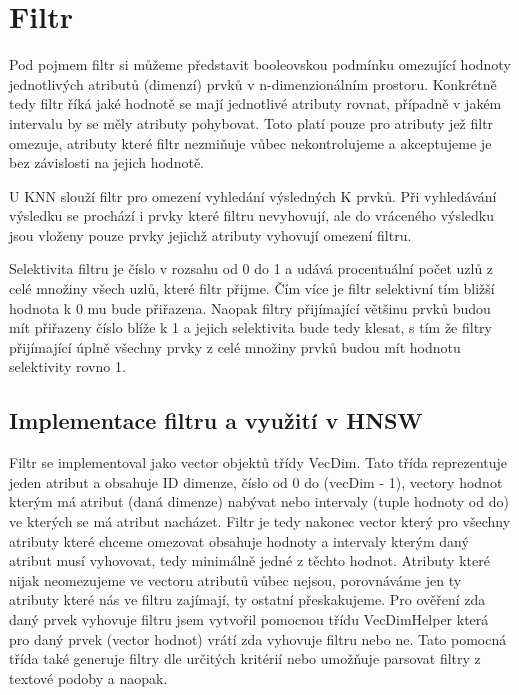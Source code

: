 \documentclass[czech,semestral,dept460,male,csharp,cpdeclaration]{diploma}
\begin{document}
	\chapter{Filtr}
	\label{chap_filtr}
	
		Pod pojmem filtr si můžeme představit booleovskou podmínku omezující hodnoty jednotlivých atributů (dimenzí) prvků v n-dimenzionálním prostoru. Konkrétně tedy filtr říká jaké hodnotě se mají jednotlivé atributy rovnat, případně v jakém intervalu by se měly atributy pohybovat. Toto platí pouze pro atributy jež filtr omezuje, atributy které filtr nezmiňuje vůbec nekontrolujeme a akceptujeme je bez závislosti na jejich hodnotě.
		
		U KNN slouží filtr pro omezení vyhledání výsledných K prvků. Při vyhledávání výsledku se prochází i prvky které filtru nevyhovují, ale do vráceného výsledku jsou vloženy pouze prvky jejichž atributy vyhovují omezení filtru.
		
		Selektivita filtru \cite{OptINFORMIX} je číslo v rozsahu od 0 do 1 a udává procentuální počet uzlů z celé množiny všech uzlů, které filtr přijme. Čím více je filtr selektivní tím bližší hodnota k 0 mu bude přiřazena. Naopak filtry přijímající většinu prvků budou mít přiřazeny číslo blíže k 1 a jejich selektivita bude tedy klesat, s tím že filtry přijímající úplně všechny prvky z celé množiny prvků budou mít hodnotu selektivity rovno 1.
		
		\section{Implementace filtru a využití v HNSW}
		
		Filtr se implementoval jako vector objektů třídy VecDim. Tato třída reprezentuje jeden atribut a obsahuje ID dimenze, číslo od 0 do (vecDim - 1), vectory hodnot kterým má atribut (daná dimenze) nabývat nebo intervaly (tuple hodnoty od do) ve kterých se má atribut nacházet. Filtr je tedy nakonec vector který pro všechny atributy které chceme omezovat obsahuje hodnoty a intervaly kterým daný atribut musí vyhovovat, tedy minimálně jedné z těchto hodnot. Atributy které nijak neomezujeme ve vectoru atributů vůbec nejsou, porovnáváme jen ty atributy které nás ve filtru zajímají, ty ostatní přeskakujeme. Pro ověření zda daný prvek vyhovuje filtru jsem vytvořil pomocnou třídu VecDimHelper která pro daný prvek (vector hodnot) vrátí zda vyhovuje filtru nebo ne. Tato pomocná třída také generuje filtry dle určitých kritérií nebo umožňuje parsovat filtry z textové podoby a naopak.
		
\end{document}

